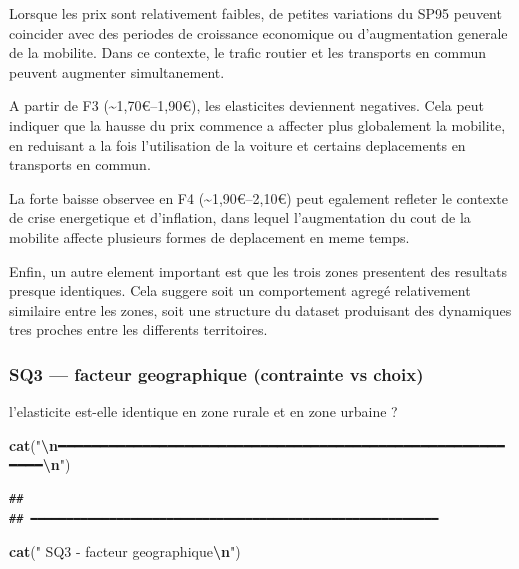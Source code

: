 \documentclass[
]{article}
\newenvironment{Shaded}{\begin{snugshade}}{\end{snugshade}}
\newcommand{\FunctionTok}[1]{\textcolor[rgb]{0.13,0.29,0.53}{\textbf{#1}}}
\newcommand{\NormalTok}[1]{#1}
\newcommand{\SpecialCharTok}[1]{\textcolor[rgb]{0.81,0.36,0.00}{\textbf{#1}}}
\newcommand{\StringTok}[1]{\textcolor[rgb]{0.31,0.60,0.02}{#1}}
\begin{document}
Lorsque les prix sont relativement faibles, de petites variations du
SP95 peuvent coincider avec des periodes de croissance economique ou
d'augmentation generale de la mobilite. Dans ce contexte, le trafic
routier et les transports en commun peuvent augmenter simultanement.

A partir de F3 (\textasciitilde1,70€--1,90€), les elasticites deviennent
negatives. Cela peut indiquer que la hausse du prix commence a affecter
plus globalement la mobilite, en reduisant a la fois l'utilisation de la
voiture et certains deplacements en transports en commun.

La forte baisse observee en F4 (\textasciitilde1,90€--2,10€) peut
egalement refleter le contexte de crise energetique et d'inflation, dans
lequel l'augmentation du cout de la mobilite affecte plusieurs formes de
deplacement en meme temps.

Enfin, un autre element important est que les trois zones presentent des
resultats presque identiques. Cela suggere soit un comportement agregé
relativement similaire entre les zones, soit une structure du dataset
produisant des dynamiques tres proches entre les differents territoires.

\subsubsection{SQ3 --- facteur geographique (contrainte vs
choix)}\label{sq3-facteur-geographique-contrainte-vs-choix}

l'elasticite est-elle identique en zone rurale et en zone urbaine ?

\begin{Shaded}
\begin{Highlighting}[]
\FunctionTok{cat}\NormalTok{(}\StringTok{"}\SpecialCharTok{\textbackslash{}n}\StringTok{━━━━━━━━━━━━━━━━━━━━━━━━━━━━━━━━━━━━━━━━━━━━━━━━━━━━━━━━━}\SpecialCharTok{\textbackslash{}n}\StringTok{"}\NormalTok{)}
\end{Highlighting}
\end{Shaded}

\begin{verbatim}
## 
## ━━━━━━━━━━━━━━━━━━━━━━━━━━━━━━━━━━━━━━━━━━━━━━━━━━━━━━━━━
\end{verbatim}

\begin{Shaded}
\begin{Highlighting}[]
\FunctionTok{cat}\NormalTok{(}\StringTok{"  SQ3 {-} facteur geographique}\SpecialCharTok{\textbackslash{}n}\StringTok{"}\NormalTok{)}
\end{Highlighting}
\end{Shaded}
\end{document}
